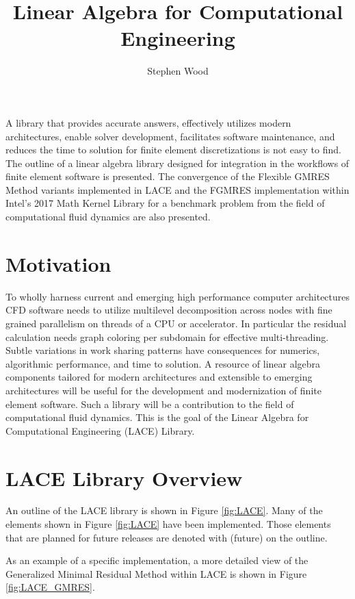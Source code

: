 \documentclass[12pt,portrait]{article}
\title{Linear Algebra for Computational Engineering}
\date{}
\author{Stephen Wood}
\begin{document}
\maketitle

A library that provides accurate answers, effectively utilizes modern architectures, enable solver 
development, facilitates software maintenance, and reduces the time to solution for finite element 
discretizations is not easy to find.
The outline of a linear algebra library designed for integration in the workflows of finite element software is presented.
The convergence of the Flexible GMRES Method variants implemented in LACE and the FGMRES implementation within Intel's 2017 Math Kernel Library for a benchmark problem from the field of computational fluid dynamics are also presented. 

\section{Motivation}
To wholly harness current and emerging high performance computer architectures CFD software 
needs to utilize multilevel decomposition across nodes with fine grained parallelism on threads of a 
CPU or accelerator. 
In particular the residual calculation needs graph coloring per subdomain for effective multi-threading.  
Subtle variations in work sharing patterns have consequences for numerics, algorithmic performance, 
and time to solution. 
A resource of linear algebra components tailored for modern architectures and extensible to emerging 
architectures will be useful for the development and modernization of finite element software. 
Such a library will be a contribution to the field of computational fluid dynamics.  
This is the goal of the Linear Algebra for Computational Engineering (LACE) Library.

\FloatBarrier
\section{LACE Library Overview}

An outline of the LACE library is shown in Figure \ref{fig:LACE}.
Many of the elements shown in Figure \ref{fig:LACE} have been implemented.
Those elements that are planned for future releases are denoted with (future) on the outline.

As an example of a specific implementation, a more detailed view of the Generalized Minimal Residual Method within LACE is shown in Figure \ref{fig:LACE_GMRES}.
\end{document}
